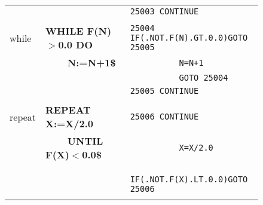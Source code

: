 \begin{figure}
\begin{center}
\begin{tabular}{||l|l|l||}
& &\verb!25003 CONTINUE!\\
& & \\
    while      &{\bf WHILE F(N)$>$0.0 DO} &\verb!25004 IF(.NOT.F(N).GT.0.0)GOTO 25005!\\
&{\bf \ \ \ \ N:=N+1\$} &\verb!          N=N+1!\\
& &\verb!          GOTO 25004!\\
& &\verb!25005 CONTINUE!\\
& & \\
   repeat     &{\bf REPEAT X:=X/2.0} &\verb!25006 CONTINUE!\\
&{\bf \ \ \ \ UNTIL F(X)$<$0.0\$} &\verb!          X=X/2.0!\\
& &\verb!      IF(.NOT.F(X).LT.0.0)GOTO 25006!\\
& & \\\hline\hline
\end{tabular}
\end{center}
\end{figure}

